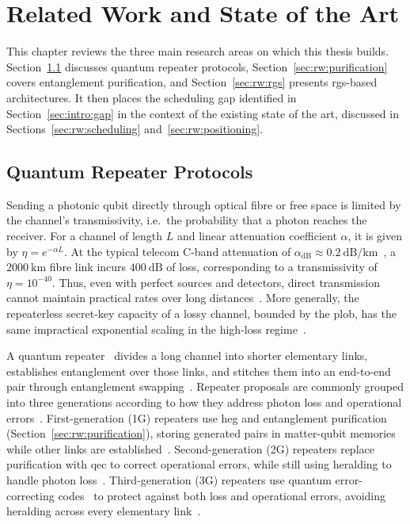 \chapter{Related Work and State of the Art}
\label{chap:relatedwork}

This chapter reviews the three main research areas on which this thesis builds. Section~\ref{sec:rw:repeaters} discusses quantum repeater protocols, Section~\ref{sec:rw:purification} covers entanglement purification, and Section~\ref{sec:rw:rgs} presents \Gls{rgs}-based architectures. It then places the scheduling gap identified in Section~\ref{sec:intro:gap} in the context of the existing state of the art, discussed in Sections~\ref{sec:rw:scheduling} and~\ref{sec:rw:positioning}.

\section{Quantum Repeater Protocols}
\label{sec:rw:repeaters}

Sending a photonic qubit directly through optical fibre or free space is limited by the channel's transmissivity, i.e.\ the probability that a photon reaches the receiver. For a channel of length $L$ and linear attenuation coefficient $\alpha$, it is given by $\eta=e^{-\alpha L}$. At the typical telecom C-band attenuation of $\alpha_{\mathrm{dB}}\approx0.2~\mathrm{dB/km}$~\cite{ITUT2024Cable}, a $2000~\mathrm{km}$ fibre link incurs $400~\mathrm{dB}$ of loss, corresponding to a transmissivity of $\eta=10^{-40}$. Thus, even with perfect sources and detectors, direct transmission cannot maintain practical rates over long distances~\cite{Sangouard2011Quantum}. More generally, the repeaterless secret-key capacity of a lossy channel, bounded by the \Gls{plob}, has the same impractical exponential scaling in the high-loss regime~\cite{Pirandola2017Fundamental,Pant2017Ratedistance,Azuma2023Quantum}.

A quantum repeater~\cite{Briegel1998Quantum} divides a long channel into shorter elementary links, establishes entanglement over those links, and stitches them into an end-to-end pair through entanglement swapping~\cite{Zukowski1993Eventreadydetectors,Grudka2008Entanglementswapping}. Repeater proposals are commonly grouped into three generations according to how they address photon loss and operational errors~\cite{Muralidharan2016Efficient,Azuma2023Quantum}. First-generation (1G) repeaters use \Gls{heg} and entanglement purification~\cite{Bennett1996Purification,Deutsch1996Quantum} (Section~\ref{sec:rw:purification}), storing generated pairs in matter-qubit memories while other links are established~\cite{Briegel1998Quantum,Duan2001Longdistance}. Second-generation (2G) repeaters replace purification with \Gls{qec} to correct operational errors, while still using heralding to handle photon loss~\cite{Jiang2009Quantum,Wo2023Resourceefficient}. Third-generation (3G) repeaters use quantum error-correcting codes~\cite{Knill2000Theory,Gottesman1997Stabilizer} to protect against both loss and operational errors, avoiding heralding across every elementary link~\cite{Fowler2010Surface,Azuma2015All}.

